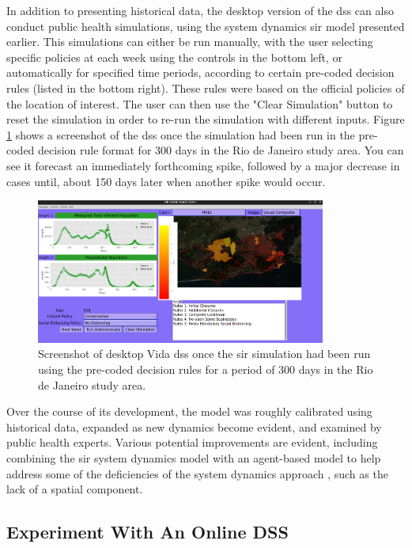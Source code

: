 In addition to presenting historical data, the desktop version of the \ac{dss} can also conduct public health simulations, using the system dynamics \ac{sir} model presented earlier. This simulations can either be run manually, with the user selecting specific policies at each week using the controls in the bottom left, or automatically for specified time periods, according to certain pre-coded decision rules (listed in the bottom right). These rules were based on the official policies of the location of interest. The user can then use the "Clear Simulation" button to reset the simulation in order to re-run the simulation with different inputs. Figure \ref{fig:vida-dss-simulation} shows a screenshot of the \ac{dss} once the simulation had been run in the pre-coded decision rule format for 300 days in the Rio de Janeiro study area. You can see it forecast an immediately forthcoming spike, followed by a major decrease in cases until, about 150 days later when another spike would occur.

\begin{figure}[!htb]
\centering
\includegraphics[width=0.85\textwidth]{Figures/chap5/vida-screenshot-simulation.png}
\caption[Vida DSS SIR Simulation Screenshot]{Screenshot of desktop Vida \ac{dss} once the \ac{sir} simulation had been run using the pre-coded decision rules for a period of 300 days in the Rio de Janeiro study area.}
\label{fig:vida-dss-simulation}
\end{figure}

Over the course of its development, the model was roughly calibrated using historical data, expanded as new dynamics become evident, and examined by public health experts. Various potential improvements are evident, including combining the \ac{sir} system dynamics model with an agent-based model to help address some of the deficiencies of the system dynamics approach \cite{ahmedVarianceSystemDynamics2012}, such as the lack of a spatial component.

\subsection{Experiment With An Online DSS}

